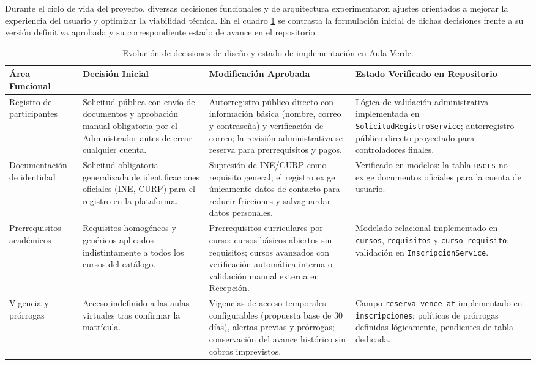 Durante el ciclo de vida del proyecto, diversas decisiones funcionales y de arquitectura experimentaron ajustes orientados a mejorar la experiencia del usuario y optimizar la viabilidad técnica. En el cuadro \ref{tabla:evolucion_decisiones} se contrasta la formulación inicial de dichas decisiones frente a su versión definitiva aprobada y su correspondiente estado de avance en el repositorio.

\begin{table}[htbp]
\centering
\caption{Evolución de decisiones de diseño y estado de implementación en Aula Verde.}
\label{tabla:evolucion_decisiones}
\small
\begin{tabularx}{\textwidth}{|p{2.8cm}|p{3.5cm}|X|p{2.6cm}|}
\hline
\rowcolor[gray]{0.9}
\textbf{Área Funcional} & \textbf{Decisión Inicial} & \textbf{Modificación Aprobada} & \textbf{Estado Verificado en Repositorio} \\
\hline
Registro de participantes & Solicitud pública con envío de documentos y aprobación manual obligatoria por el Administrador antes de crear cualquier cuenta. & Autorregistro público directo con información básica (nombre, correo y contraseña) y verificación de correo; la revisión administrativa se reserva para prerrequisitos y pagos. & Lógica de validación administrativa implementada en \texttt{SolicitudRegistroService}; autorregistro público directo proyectado para controladores finales. \\
\hline
Documentación de identidad & Solicitud obligatoria generalizada de identificaciones oficiales (INE, CURP) para el registro en la plataforma. & Supresión de INE/CURP como requisito general; el registro exige únicamente datos de contacto para reducir fricciones y salvaguardar datos personales. & Verificado en modelos: la tabla \texttt{users} no exige documentos oficiales para la cuenta de usuario. \\
\hline
Prerrequisitos académicos & Requisitos homogéneos y genéricos aplicados indistintamente a todos los cursos del catálogo. & Prerrequisitos curriculares por curso: cursos básicos abiertos sin requisitos; cursos avanzados con verificación automática interna o validación manual externa en Recepción. & Modelado relacional implementado en \texttt{cursos}, \texttt{requisitos} y \texttt{curso\_requisito}; validación en \texttt{InscripcionService}. \\
\hline
Vigencia y prórrogas & Acceso indefinido a las aulas virtuales tras confirmar la matrícula. & Vigencias de acceso temporales configurables (propuesta base de 30 días), alertas previas y prórrogas; conservación del avance histórico sin cobros imprevistos. & Campo \texttt{reserva\_vence\_at} implementado en \texttt{inscripciones}; políticas de prórrogas definidas lógicamente, pendientes de tabla dedicada. \\

\end{tabularx}
\end{table}
